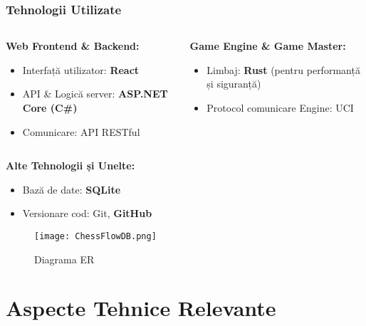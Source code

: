 \documentclass{beamer}
\begin{document}
\begin{frame}
    \frametitle{Tehnologii Utilizate}
    \begin{columns}[T] %
        \begin{column}{0.5\textwidth}
            \textbf{Web Frontend \& Backend:}
            \begin{itemize}
                \item Interfață utilizator: \textbf{React}
                \item API & Logică server: \textbf{ASP.NET Core (C\#)}
                \item Comunicare: API RESTful
            \end{itemize}
        \end{column}
        \begin{column}{0.5\textwidth}
            \textbf{Game Engine \& Game Master:}
            \begin{itemize}
                \item Limbaj: \textbf{Rust} (pentru performanță și siguranță)
                \item Protocol comunicare Engine: UCI
            \end{itemize}
        \end{column}
    \end{columns}
    \vfill
    \textbf{Alte Tehnologii și Unelte:}
    \begin{itemize}
        \item Bază de date: \textbf{SQLite}
        \item Versionare cod: Git, \textbf{GitHub}
    \end{itemize}
\end{frame}

\begin{frame}
    \begin{figure}
        \centering
        \texttt{[image: ChessFlowDB.png]}
        \caption{Diagrama ER}
    \end{figure}
\end{frame}

\section{Aspecte Tehnice Relevante}
\end{document}

